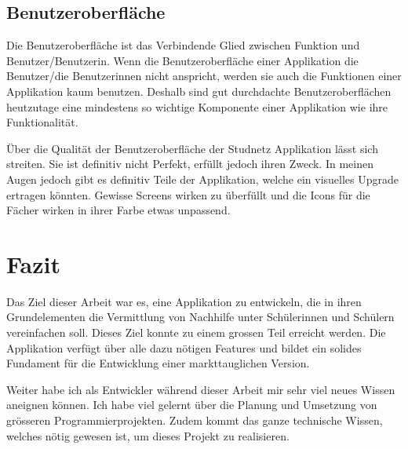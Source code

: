 \documentclass[../main.tex]{subfiles}
\begin{document}
	\subsection*{Benutzeroberfläche}
	Die Benutzeroberfläche ist das Verbindende Glied zwischen Funktion und Benutzer/Benutzerin. Wenn die Benutzeroberfläche einer Applikation die Benutzer/die Benutzerinnen nicht anspricht, werden sie auch die Funktionen einer Applikation kaum benutzen. Deshalb sind gut durchdachte Benutzeroberflächen heutzutage eine mindestens so wichtige Komponente einer Applikation wie ihre Funktionalität.
	
	Über die Qualität der Benutzeroberfläche der Studnetz Applikation lässt sich streiten. Sie ist definitiv nicht Perfekt, erfüllt jedoch ihren Zweck. In meinen Augen jedoch gibt es definitiv Teile der Applikation, welche ein visuelles Upgrade ertragen könnten. Gewisse Screens wirken zu überfüllt und die Icons für die Fächer wirken in ihrer Farbe etwas unpassend.
	
	\section{Fazit}
	Das Ziel dieser Arbeit war es, eine Applikation zu entwickeln, die in ihren Grundelementen die Vermittlung von Nachhilfe unter Schülerinnen und Schülern vereinfachen soll. Dieses Ziel konnte zu einem grossen Teil erreicht werden. Die Applikation verfügt über alle dazu nötigen Features und bildet ein solides Fundament für die Entwicklung einer markttauglichen Version.
	
	Weiter habe ich als Entwickler während dieser Arbeit mir sehr viel neues Wissen aneignen können. Ich habe viel gelernt über die Planung und Umsetzung von grösseren Programmierprojekten. Zudem kommt das ganze technische  Wissen, welches nötig gewesen ist, um dieses Projekt zu realisieren.
\end{document}
